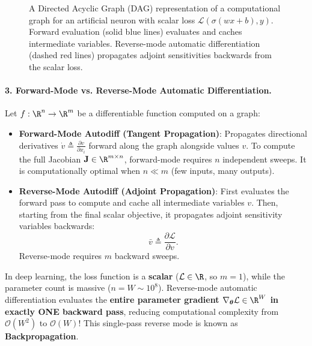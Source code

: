 \begin{figure}[H]
\caption{A Directed Acyclic Graph (DAG) representation of a computational graph for an artificial neuron with scalar loss $\mathcal{L}(\sigma(wx + b), y)$. Forward evaluation (solid blue lines) evaluates and caches intermediate variables. Reverse-mode automatic differentiation (dashed red lines) propagates adjoint sensitivities backwards from the scalar loss.}
\label{fig:computational_graph}
\end{figure}

\paragraph{3. Forward-Mode vs. Reverse-Mode Automatic Differentiation.}
Let $f: \R^n \to \R^m$ be a differentiable function computed on a graph:
\begin{itemize}
  \item \textbf{Forward-Mode Autodiff (Tangent Propagation)}: Propagates directional derivatives $\dot{v} \triangleq \frac{\partial v}{\partial x_i}$ forward along the graph alongside values $v$. To compute the full Jacobian $\mathbf{J} \in \R^{m \times n}$, forward-mode requires $n$ independent sweeps. It is computationally optimal when $n \ll m$ (few inputs, many outputs).
  \item \textbf{Reverse-Mode Autodiff (Adjoint Propagation)}: First evaluates the forward pass to compute and cache all intermediate variables $v$. Then, starting from the final scalar objective, it propagates adjoint sensitivity variables backwards:
    \begin{equation}
    \bar{v} \triangleq \frac{\partial \mathcal{L}}{\partial v}.
    \label{eq:adjoint_definition}
    \end{equation}
    Reverse-mode requires $m$ backward sweeps. 
\end{itemize}

In deep learning, the loss function is a \textbf{scalar} ($\mathcal{L} \in \R$, so $m = 1$), while the parameter count is massive ($n = W \sim 10^8$). Reverse-mode automatic differentiation evaluates the \textbf{entire parameter gradient $\nabla_{\boldsymbol{\theta}} \mathcal{L} \in \R^W$ in exactly ONE backward pass}, reducing computational complexity from $\mathcal{O}(W^2)$ to $\mathcal{O}(W)$! This single-pass reverse mode is known as \textbf{Backpropagation}.

